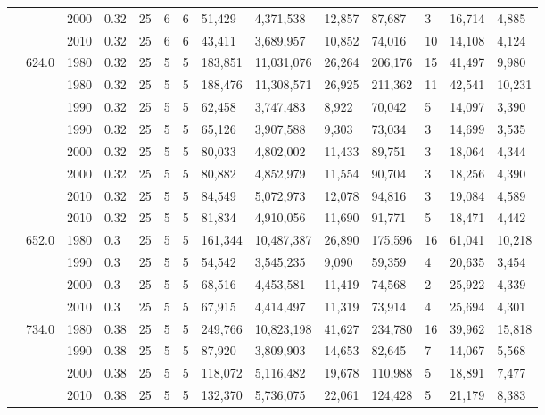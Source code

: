 \begin{table}[]
\begin{tabular}{|l|l|l|l|l|l|l|l|l|l|l|l|l|l|}
	&  & 2000 & 0.32 & 25 & 6 & 6 & 51,429 & 4,371,538 & 12,857 & 87,687 & 3 & 16,714 & 4,885 \\ \cline{3-14} 
	&  & 2010 & 0.32 & 25 & 6 & 6 & 43,411 & 3,689,957 & 10,852 & 74,016 & 10 & 14,108 & 4,124 \\ \cline{2-14} 
	& \multirow{8}{*}{624.0} & 1980 & 0.32 & 25 & 5 & 5 & 183,851 & 11,031,076 & 26,264 & 206,176 & 15 & 41,497 & 9,980 \\ \cline{3-14} 
	&  & 1980 & 0.32 & 25 & 5 & 5 & 188,476 & 11,308,571 & 26,925 & 211,362 & 11 & 42,541 & 10,231 \\ \cline{3-14} 
	&  & 1990 & 0.32 & 25 & 5 & 5 & 62,458 & 3,747,483 & 8,922 & 70,042 & 5 & 14,097 & 3,390 \\ \cline{3-14} 
	&  & 1990 & 0.32 & 25 & 5 & 5 & 65,126 & 3,907,588 & 9,303 & 73,034 & 3 & 14,699 & 3,535 \\ \cline{3-14} 
	&  & 2000 & 0.32 & 25 & 5 & 5 & 80,033 & 4,802,002 & 11,433 & 89,751 & 3 & 18,064 & 4,344 \\ \cline{3-14} 
	&  & 2000 & 0.32 & 25 & 5 & 5 & 80,882 & 4,852,979 & 11,554 & 90,704 & 3 & 18,256 & 4,390 \\ \cline{3-14} 
	&  & 2010 & 0.32 & 25 & 5 & 5 & 84,549 & 5,072,973 & 12,078 & 94,816 & 3 & 19,084 & 4,589 \\ \cline{3-14} 
	&  & 2010 & 0.32 & 25 & 5 & 5 & 81,834 & 4,910,056 & 11,690 & 91,771 & 5 & 18,471 & 4,442 \\ \cline{2-14} 
	& \multirow{4}{*}{652.0} & 1980 & 0.3 & 25 & 5 & 5 & 161,344 & 10,487,387 & 26,890 & 175,596 & 16 & 61,041 & 10,218 \\ \cline{3-14} 
	&  & 1990 & 0.3 & 25 & 5 & 5 & 54,542 & 3,545,235 & 9,090 & 59,359 & 4 & 20,635 & 3,454 \\ \cline{3-14} 
	&  & 2000 & 0.3 & 25 & 5 & 5 & 68,516 & 4,453,581 & 11,419 & 74,568 & 2 & 25,922 & 4,339 \\ \cline{3-14} 
	&  & 2010 & 0.3 & 25 & 5 & 5 & 67,915 & 4,414,497 & 11,319 & 73,914 & 4 & 25,694 & 4,301 \\ \cline{2-14} 
	& \multirow{4}{*}{734.0} & 1980 & 0.38 & 25 & 5 & 5 & 249,766 & 10,823,198 & 41,627 & 234,780 & 16 & 39,962 & 15,818 \\ \cline{3-14} 
	&  & 1990 & 0.38 & 25 & 5 & 5 & 87,920 & 3,809,903 & 14,653 & 82,645 & 7 & 14,067 & 5,568 \\ \cline{3-14} 
	&  & 2000 & 0.38 & 25 & 5 & 5 & 118,072 & 5,116,482 & 19,678 & 110,988 & 5 & 18,891 & 7,477 \\ \cline{3-14} 
	&  & 2010 & 0.38 & 25 & 5 & 5 & 132,370 & 5,736,075 & 22,061 & 124,428 & 5 & 21,179 & 8,383 \\ \cline{2-14} 

\end{tabular}
\end{table}
